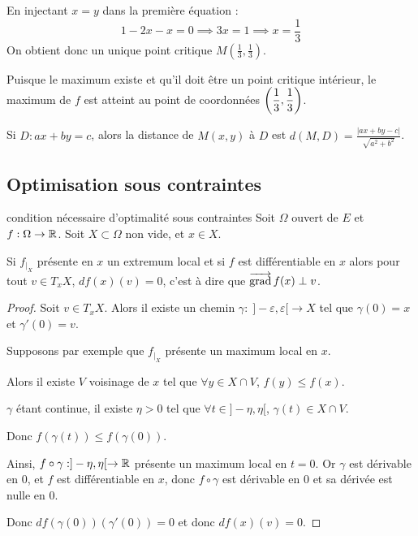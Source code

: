 \begin{exemple}
    En injectant $x=y$ dans la première équation :
    \[
    1 - 2x - x = 0 \implies 3x = 1 \implies x = \frac{1}{3}
    \]
    On obtient donc un unique point critique $M(\frac{1}{3}, \frac{1}{3})$.


    \svspace Puisque le maximum existe et qu'il doit être un point critique intérieur, le maximum de $f$ est atteint au point de coordonnées $\displaystyle \left(\frac{1}{3}, \frac{1}{3}\right)$.
\end{exemple}


\begin{remarque}
    Si $D : ax + by = c$, alors la distance de $M(x, y)$ à $D$ est 
    $\displaystyle d(M, D) = \frac{|ax + by - c|}{\sqrt{a^2 + b^2}}$.
\end{remarque}


\subsection{Optimisation sous contraintes}


\lvspace
\avspace

\begin{propositionnt}{condition nécessaire d'optimalité sous contraintes}{}
    Soit $\Omega$ ouvert de $E$ et $f : \Omega \to \mathbb{R}$. Soit $X \subset \Omega$ non vide, et 
    $x \in X$. 

    Si $f_{|_X}$ présente en $x$ un extremum local et si $f$ est différentiable en $x$ alors 
    pour tout $v \in T_xX$, $df(x)(v) = 0$, c'est à dire que $\overrightarrow{\operatorname{grad}} \, f(x) \perp v$. 
\end{propositionnt}


\begin{proof}
    Soit $v \in T_xX$. Alors il existe un chemin $\gamma : \; ]-\varepsilon, \varepsilon[ \to X$
    tel que $\gamma(0) = x$ et $\gamma'(0) = v$.

    Supposons par exemple que $f_{|_X}$ présente un maximum local en $x$.

    Alors il existe $V$ voisinage de $x$ tel que $\forall y \in X \cap V$, $f(y) \leqslant f(x)$.

    $\gamma$ étant continue, il existe $\eta > 0$ tel que $\forall t \in ]-\eta, \eta[$, $\gamma(t) \in X \cap V$.

    Donc $f(\gamma(t)) \leqslant f(\gamma(0))$.

    Ainsi, $f \circ \gamma : ]-\eta, \eta[ \to \mathbb{R}$ présente un maximum local en $t = 0$.
    Or $\gamma$ est dérivable en $0$, et $f$ est différentiable en $x$, donc 
    $f \circ \gamma$ est dérivable en $0$ et sa dérivée est nulle en $0$.

    Donc $df(\gamma(0))(\gamma'(0)) = 0$ et donc $df(x)(v) = 0$.
\end{proof}

